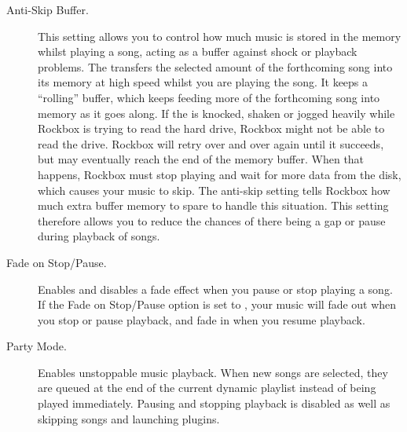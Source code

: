 \begin{description}
  \item[Anti-Skip Buffer. ]This setting allows you to control how much music is
    stored in the \daps{} memory whilst playing a song, acting as a buffer
    against shock or playback problems. The \dap{} transfers the selected
    amount of the forthcoming song into its memory at high speed whilst you are
    playing the song. It keeps a ``rolling'' buffer, which keeps feeding more
    of the forthcoming song into memory as it goes along.
    If the \dap{} is knocked, shaken or jogged heavily while Rockbox is trying
    to read the hard drive, Rockbox might not be able to read the drive.
    Rockbox will retry over and over again until it succeeds, but may
    eventually reach the end of the memory buffer. When that happens, Rockbox
    must stop playing and wait for more data from the disk, which causes your
    music to skip. The anti-skip setting tells Rockbox how much extra buffer
    memory to spare to handle this situation. This setting therefore allows you
    to reduce the chances of there being a gap or pause during playback of
    songs.
    
    
    
  \item[Fade on Stop/Pause. ]Enables and disables a fade effect when you
    pause or stop playing a song. If the Fade on Stop/Pause option is
    set to , your music will fade out when you stop or pause 
    playback, and fade in when you resume playback.
    
  \item[Party Mode. ]Enables unstoppable music playback. When new songs are
    selected, they are queued at the end of the current dynamic playlist
    instead of being played immediately. Pausing and stopping playback is
    disabled as well as skipping songs and launching plugins.


\end{description}
